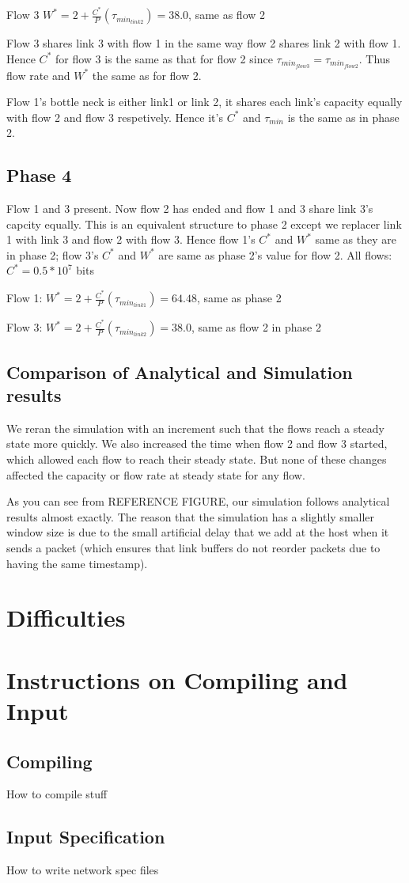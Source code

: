 \documentclass[12pt]{article}
\begin{document}
Flow 3 $W^* = 2+\frac{C^*}{P}(\tau_{min_{link2}}) = 38.0$, same as flow 2

Flow 3 shares link 3 with flow 1 in the same way flow 2 shares link 2 with flow 1. Hence $C^*$ for flow 3 is the same as that for flow 2 since $\tau_{min_{flow3}}=\tau_{min_{flow2}}$. Thus flow rate and $W^*$ the same as for flow 2.

Flow 1's bottle neck is either link1 or link 2, it shares each link's capacity equally with flow 2 and flow 3 respetively. Hence it's $C^*$ and $\tau_{min}$ is the same as in phase 2.


\subsection*{Phase 4}
Flow 1 and 3 present.
Now flow 2 has ended and flow 1 and 3 share link 3's capcity equally. This is an equivalent structure to phase 2 except we replacer link 1 with link 3 and flow 2 with flow 3. Hence flow 1's $C^*$ and $W^*$ same as they are in phase 2; flow 3's $C^*$ and $W^*$ are same as phase 2's value for flow 2.
All flows: $C^* = 0.5*10^7$ bits

Flow 1: $W^* = 2+\frac{C^*}{P}(\tau_{min_{link1}}) = 64.48$, same as phase 2

Flow 3: $W^* = 2+\frac{C^*}{P}(\tau_{min_{link2}}) = 38.0$, same as flow 2 in phase 2


\subsection{Comparison of Analytical and Simulation results}
We reran the simulation with an increment such that the flows reach a steady state more quickly. We also increased the time when flow 2 and flow 3 started, which allowed each flow to reach their steady state. But none of these changes affected the capacity or flow rate at steady state for any flow.

As you can see from REFERENCE FIGURE, our simulation follows analytical results almost exactly. The reason that the simulation has a slightly smaller window size is due to the small artificial delay that we add at the host when it sends a packet (which ensures that link buffers do not reorder packets due to having the same timestamp).

\section{Difficulties}



\appendix
\section{Instructions on Compiling and Input}

\subsection{Compiling}
How to compile stuff


\subsection{Input Specification}
How to write network spec files
\end{document}
